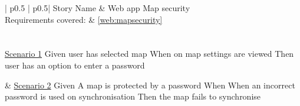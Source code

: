 \begin{longtable}{| p{} | p{}|}
	\hline
	\newline Story Name & \newline Web app Map security\\\hline
	\newline Requirements covered: & \newline \ref{web:mapsecurity}\\\hline
	\\\hline
	\\\hline
	\newline\underline{Scenario 1}\newline
	Given user has selected map \newline
	When on map settings are viewed \newline 
	Then user has an option to enter a password\newline
	
	&
	\newline\underline{Scenario 2}\newline
	Given A map is protected by a password \newline
	When When an incorrect password is used on synchronisation \newline 
	Then the map fails to synchronise\newline
	\\\hline
\end{longtable}

